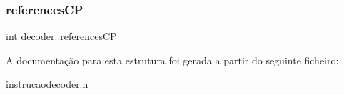 \hypertarget{struct_mapper_af2d2cc85289235cb8ba33cb807404241}{}\label{struct_mapper_af2d2cc85289235cb8ba33cb807404241} 
\subsubsection{\texorpdfstring{references\+CP}{referencesCP}}
{\footnotesize\ttfamily int decoder\+::references\+CP}



A documentação para esta estrutura foi gerada a partir do seguinte ficheiro\+:\begin{DoxyCompactItemize}
\item 
\hyperlink{instruction_mapper_8h}{instrucao\+decoder.\+h}\end{DoxyCompactItemize}
